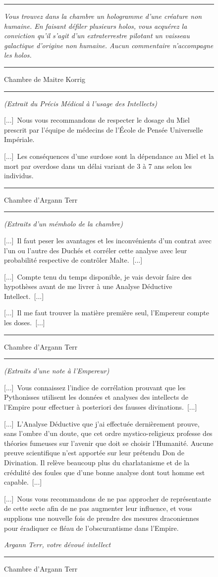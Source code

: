 \documentclass{article}
\newcommand{\newcharacter}{\clearpage\setcounter{figure}{0}}
\newcommand{\indice}[4]{
  \begin{figure}[H]
    \begin{center}
      \rule{0.5\textwidth}{1pt}
    \end{center}
    \begin{framed}
      \begin{samepage}
        \textit{#1}
        \nopagebreak

        #2

        \nopagebreak

        \hfill\textit{#3}
      \end{samepage}
    \end{framed}
    \caption{#4}
    \begin{center}
      \rule{0.5\textwidth}{1pt}
    \end{center}
  \end{figure}
}
\begin{document}
\indice
{
    Vous trouvez dans la chambre un hologramme d'une créature non humaine. En
    faisant défiler plusieurs holos, vous acquérez la conviction qu'il s'agit
    d'un extraterrestre pilotant un vaisseau galactique d'origine non humaine.
    Aucun commentaire n'accompagne les holos.
}{}{}
{Chambre de Maitre Korrig}

\newcharacter

\indice
{(Extrait du Précis Médical à l'usage des Intellects)}
{
    [...]~Nous vous recommandons de respecter le dosage du Miel prescrit par
    l'équipe de médecins de l'École de Pensée Universelle Impériale.

    \nobreak

    [...]~Les conséquences d'une surdose sont la dépendance au Miel et la mort
    par overdose dans un délai variant de 3 à 7 ans selon les individus.
}{}
{Chambre d'Argann Terr}

\indice
{(Extraits d'un mémholo de la chambre)}
{
    [...]~Il faut peser les avantages et les inconvénients d'un contrat avec
    l'un ou l'autre des Duchés et corréler cette analyse avec leur probabilité
    respective de contrôler Malte.~[...]

    \nobreak

    [...]~Compte tenu du temps disponible, je vais devoir faire des hypothèses
    avant de me livrer à une Analyse Déductive Intellect.~[...]

    \nobreak

    [...]~Il me faut trouver la matière première seul, l'Empereur compte les
    doses.~[...]
}{}
{Chambre d'Argann Terr}

\indice
{(Extraits d'une note à l'Empereur)}
{
    [...]~Vous connaissez l'indice de corrélation prouvant que les Pythonisses
    utilisent les données et analyses des intellects de l'Empire pour effectuer
    à posteriori des fausses divinations.~[...]

    \nobreak

    [...]~L'Analyse Déductive que j'ai effectuée dernièrement prouve, sans
    l'ombre d'un doute, que cet ordre mystico-religieux professe des théories
    fumeuses sur l'avenir que doit se choisir l'Humanité. Aucune preuve
    scientifique n'est apportée sur leur prétendu Don de Divination. Il relève
    beaucoup plus du charlatanisme et de la crédulité des foules que d'une
    bonne analyse dont tout homme est capable.~[...]

    \nobreak

    [...]~Nous vous recommandons de ne pas approcher de représentante de cette
    secte afin de ne pas augmenter leur influence, et vous supplions une
    nouvelle fois de prendre des mesures draconiennes pour éradiquer ce fléau
    de l'obscurantisme dans l'Empire.
}{Argann Terr, votre dévoué intellect}
{Chambre d'Argann Terr}
\end{document}
